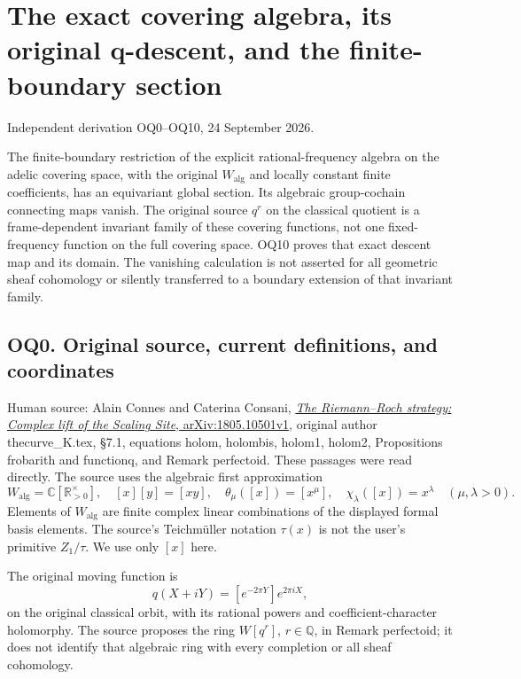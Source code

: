 \section{The exact covering algebra, its original q-descent, and the
finite-boundary
section}\label{the-exact-covering-algebra-its-original-q-descent-and-the-finite-boundary-section}

Independent derivation OQ0--OQ10, 24 September 2026.

The finite-boundary restriction of the explicit rational-frequency
algebra on the adelic covering space, with the original
\(W_{\mathrm{alg}}\) and locally constant finite coefficients, has an
equivariant global section. Its algebraic group-cochain connecting maps
vanish. The original source \(q^r\) on the classical quotient is a
frame-dependent invariant family of these covering functions, not one
fixed-frequency function on the full covering space. OQ10 proves that
exact descent map and its domain. The vanishing calculation is not
asserted for all geometric sheaf cohomology or silently transferred to a
boundary extension of that invariant family.

\subsection{OQ0. Original source, current definitions, and
coordinates}\label{oq0.-original-source-current-definitions-and-coordinates}

Human source: Alain Connes and Caterina Consani,
\href{https://arxiv.org/abs/1805.10501v1}{\emph{The Riemann--Roch
strategy: Complex lift of the Scaling Site}, arXiv:1805.10501v1},
original author thecurve\_K.tex, §7.1, equations holom, holombis,
holom1, holom2, Propositions frobarith and functionq, and Remark
perfectoid. These passages were read directly. The source uses the
algebraic first approximation \[
W_{\mathrm{alg}}=\mathbb C[\mathbb R_{>0}^{\times}],
\quad [x][y]=[xy],\quad
\theta_\mu([x])=[x^\mu],\quad
\chi_\lambda([x])=x^\lambda
\quad(\mu,\lambda>0).
\tag{OQ0.1}
\] Elements of \(W_{\mathrm{alg}}\) are finite complex linear
combinations of the displayed formal basis elements. The source's
Teichmüller notation \(\tau(x)\) is not the user's primitive
\(Z_1/\tau\). We use only \([x]\) here.

The original moving function is \[
q(X+iY)=[e^{-2\pi Y}]e^{2\pi iX},
\tag{OQ0.2}
\] on the original classical orbit, with its rational powers and
coefficient-character holomorphy. The source proposes the ring
\(W[q^r]\), \(r\in\mathbb Q\), in Remark perfectoid; it does not
identify that algebraic ring with every completion or all sheaf
cohomology.

